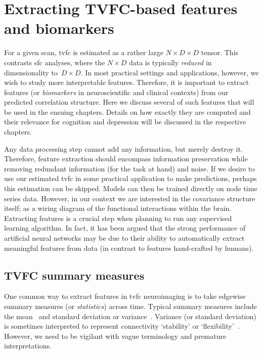 \clearpage
\section{Extracting TVFC-based features and biomarkers}\label{sec:tvfc-feature-extraction}

For a given scan, \gls{tvfc} is estimated as a rather large $N \times D \times D$ tensor.
This contrasts \gls{sfc} analyses, where the $N \times D$ data is typically \emph{reduced} in dimensionality to~$D \times D$.
%
In most practical settings and applications, however, we wish to study more interpretable features.
Therefore, it is important to extract features (or \emph{biomarkers} in neuroscientific and clinical contexts) from our predicted correlation structure.
Here we discuss several of such features that will be used in the ensuing chapters.
Details on how exactly they are computed and their relevance for cognition and depression will be discussed in the respective chapters.

Any data processing step cannot add any information, but merely destroy it.
Therefore, feature extraction should encompass information preservation while removing redundant information (for the task at hand) and noise.
If we desire to use our estimated \gls{tvfc} in some practical application to make predictions, perhaps this estimation can be skipped.
Models can then be trained directly on node time series data.
However, in our context we are interested in the covariance structure itself; as a wiring diagram of the functional interactions within the brain.
%
Extracting features is a crucial step when planning to run any supervised learning algorithm.
In fact, it has been argued that the strong performance of artificial neural networks may be due to their ability to automatically extract meaningful features from data (in contrast to features hand-crafted by humans).

\subsection{TVFC summary measures}\label{subsec:tvfc-summary-measures}

One common way to extract features in \gls{tvfc} neuroimaging is to take edgewise summary measures (or \emph{statistics}) across time.
%
Typical summary measures include the mean~\parencite[analogous to \gls{sfc} estimates; sometimes considered the connection `strength', see e.g.][]{Choe2017} and standard deviation or variance~\parencite[see e.g.][]{Chang2010, Hutchison2013b, Kucyi2013, Kucyi2014, Kaiser2015, Demirtas2016, Choe2017}.
Variance (or standard deviation) is sometimes interpreted to represent connectivity `stability' or `flexibility'~\parencite[see e.g.][]{Allen2014}.
However, we need to be vigilant with vague terminology and premature interpretations.

